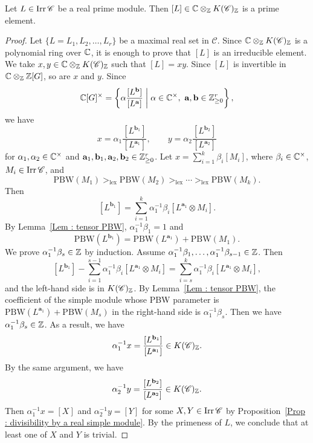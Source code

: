 \begin{Lem}
\label{Lem : real prime modules give prime elements over C}
Let $L \in \mathop{\mathrm{Irr}}\nolimits\mathscr{C}$ be a real prime module.
Then $[L] \in \mathbb{C} \otimes_{\mathbb{Z}} K(\mathscr{C})_{\mathbb{Z}}$
is a prime element.
\end{Lem}

\begin{proof}
Let $\{L = L_1, L_2, \ldots, L_r\}$
be a maximal real set in $\mathscr{C}$.
Since $\mathbb{C} \otimes_{\mathbb{Z}} K(\mathscr{C})_{\mathbb{Z}}$
is a polynomial ring over $\mathbb{C}$,
it is enough to prove that $[L]$ is an irreducible element.
We take $x, y \in \mathbb{C} \otimes_{\mathbb{Z}} K(\mathscr{C})_{\mathbb{Z}}$
such that $[L] = xy$.
Since $[L]$ is invertible in $\mathbb{C} \otimes_{\mathbb{Z}} \mathbb{Z}[G]$,
so are $x$ and $y$.
Since
\[
\C[G]^\times
= \left\{
\alpha\frac{[L^{\mathbf{b}}]}{[L^{\mathbf{a}}]}
\;\middle|\; \alpha \in \C^\times,\ 
\mathbf{a}, \mathbf{b} \in \Z_{\geq 0}^r
\right\},
\]
we have
\[
x = \alpha_1\frac{[L^{\mathbf{b}_1}]}{[L^{\mathbf{a}_1}]},
\qquad
y = \alpha_2\frac{[L^{\mathbf{b}_2}]}{[L^{\mathbf{a}_2}]}
\]
for $\alpha_1, \alpha_2 \in \mathbb{C}^\times$
and $\mathbf{a}_1, \mathbf{b}_1, \mathbf{a}_2, \mathbf{b}_2
\in \mathbb{Z}_{\geq 0}^r$.
Let $x = \sum_{i=1}^k \beta_i[M_i]$,
where $\beta_i \in \mathbb{C}^\times$, $M_i \in \mathop{\mathrm{Irr}}\nolimits\mathscr{C}$, and
\[
\mathrm{PBW}(M_1) >_{\mathrm{lex}} \mathrm{PBW}(M_2)
>_{\mathrm{lex}} \cdots >_{\mathrm{lex}} \mathrm{PBW}(M_k).
\]
Then
\[
[L^{\mathbf{b}_1}]
= \sum_{i=1}^k \alpha_1^{-1}\beta_i
[L^{\mathbf{a}_1} \otimes M_i].
\]
By Lemma~\ref{Lem : tensor PBW},
$\alpha_1^{-1}\beta_1 = 1$ and
\[
\mathrm{PBW}(L^{\mathbf{b}_1})
= \mathrm{PBW}(L^{\mathbf{a}_1}) + \mathrm{PBW}(M_1).
\]
We prove $\alpha_1^{-1}\beta_s \in \mathbb{Z}$ by induction.
Assume $\alpha_1^{-1}\beta_1, \ldots,
\alpha_1^{-1}\beta_{s-1} \in \mathbb{Z}$.
Then
\[
[L^{\mathbf{b}_1}]
- \sum_{i=1}^{s-1}\alpha_1^{-1}\beta_i
[L^{\mathbf{a}_1} \otimes M_i]
= \sum_{i=s}^k \alpha_1^{-1}\beta_i
[L^{\mathbf{a}_1} \otimes M_i],
\]
and the left-hand side is in $K(\mathscr{C})_{\mathbb{Z}}$.
By Lemma~\ref{Lem : tensor PBW},
the coefficient of the simple module whose PBW parameter is
$\mathrm{PBW}(L^{\mathbf{a}_1}) + \mathrm{PBW}(M_s)$
in the right-hand side is $\alpha_1^{-1}\beta_s$.
Then we have $\alpha_1^{-1}\beta_s \in \mathbb{Z}$.
As a result, we have
\[
\alpha_1^{-1}x
= \frac{[L^{\mathbf{b}_1}]}{[L^{\mathbf{a}_1}]}
\in K(\mathscr{C})_{\mathbb{Z}}.
\]
By the same argument, we have
\[
\alpha_2^{-1}y
= \frac{[L^{\mathbf{b}_2}]}{[L^{\mathbf{a}_2}]}
\in K(\mathscr{C})_{\mathbb{Z}}.
\]
Then $\alpha_1^{-1}x = [X]$ and $\alpha_2^{-1}y = [Y]$
for some $X, Y \in \mathop{\mathrm{Irr}}\nolimits\mathscr{C}$
by Proposition~\ref{Prop : divisibility by a real simple module}.
By the primeness of $L$, we conclude that
at least one of $X$ and $Y$ is trivial.
\end{proof}

